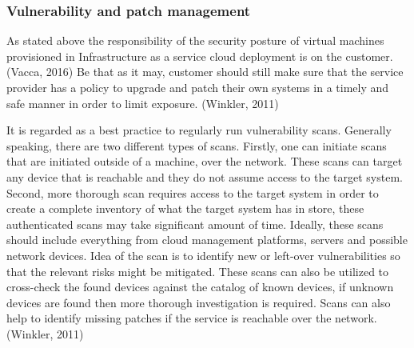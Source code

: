 \documentclass{article}
\begin{document}
\subsubsection{Vulnerability and patch management}
As stated above the responsibility of the security posture of virtual machines provisioned in Infrastructure as a service cloud deployment is on the customer. (Vacca, 2016) Be that as it may, customer should still make sure that the service provider has a policy to upgrade and patch their own systems in a timely and safe manner in order to limit exposure. (Winkler, 2011)
\par
It is regarded as a best practice to regularly run vulnerability scans. Generally speaking, there are two different types of scans. Firstly, one can initiate scans that are initiated outside of a machine, over the network. These scans can target any device that is reachable and they do not assume access to the target system. Second, more thorough scan requires access to the target system in order to create a complete inventory of what the target system has in store, these authenticated scans may take significant amount of time. Ideally, these scans should include everything from cloud management platforms, servers and possible network devices. Idea of the scan is to identify new or left-over vulnerabilities so that the relevant risks might be mitigated. These scans can also be utilized to cross-check the found devices against the catalog of known devices, if unknown devices are found then more thorough investigation is required. Scans can also help to identify missing patches if the service is reachable over the network. (Winkler, 2011)
\end{document}
